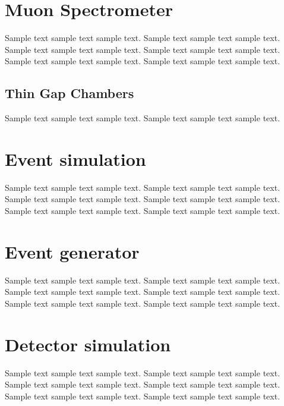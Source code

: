 \section{Muon Spectrometer}
\label{sec:for}
Sample text sample text sample text. Sample text sample text sample text.
Sample text sample text sample text. Sample text sample text sample text.
Sample text sample text sample text. Sample text sample text sample text.

\subsection{Thin Gap Chambers}
Sample text sample text sample text. Sample text sample text sample text.
\section{Event simulation}
Sample text sample text sample text. Sample text sample text sample text.
Sample text sample text sample text. Sample text sample text sample text.
Sample text sample text sample text. Sample text sample text sample text.

\section{Event generator}
\label{sec:data}
Sample text sample text sample text. Sample text sample text sample text.
Sample text sample text sample text. Sample text sample text sample text.
Sample text sample text sample text. Sample text sample text sample text.

\section{Detector simulation}
Sample text sample text sample text. Sample text sample text sample text.
Sample text sample text sample text. Sample text sample text sample text.
Sample text sample text sample text. Sample text sample text sample text.
